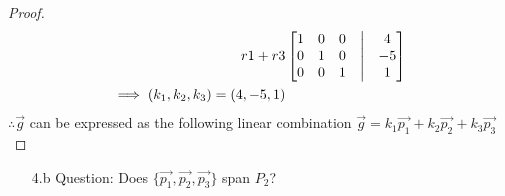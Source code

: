 \documentclass[11pt]{article}
\begin{document}
\begin{proof}
\begin{align*}
                r1 + r3
                 &
                \begin{bmatrix}
                        1 & 0 & 0 & \bigm| & 4  \\
                        0 & 1 & 0 & \bigm| & -5 \\
                        0 & 0 & 1 & \bigm| & 1  \\
                \end{bmatrix} \\
                \implies (k_{1}, k_{2}, k_{3}) = (4, -5, 1)
        \end{align*}
        $\therefore \vec{g}$ can be expressed as the following linear combination $\vec{g} = k_{1}\vec{p_{1}} + k_{2}\vec{p_{2}} + k_{3}\vec{p_{3}}$
\end{proof}
\pagebreak
\begin{enumerate}
        \item[4.b]Question: Does $\{\vec{p_1},\vec{p_2},\vec{p_3}\}$ span $P_2$?
\end{enumerate}
\end{document}
